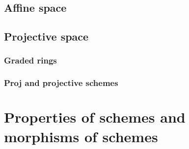 \subsection{Affine space}



\subsection{Projective space}

\subsubsection{Graded rings}






















\subsubsection{Proj and projective schemes}








\section{Properties of schemes and morphisms of schemes}

